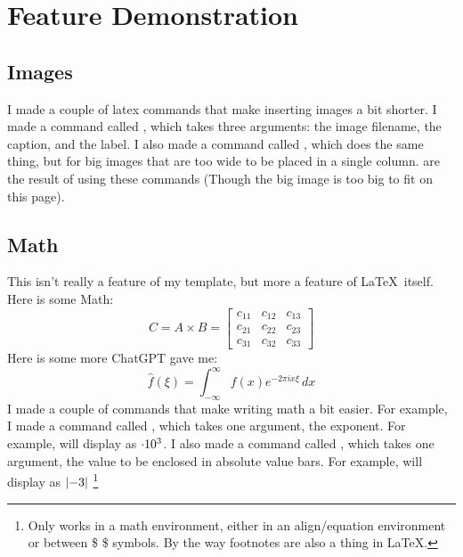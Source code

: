 \section{Feature Demonstration}

\subsection{Images}

I made a couple of latex commands that make inserting images a bit shorter. I made a command called \code{\insertimage{}{}{}}, which takes three arguments: the image filename, the caption, and the label. I also made a command called \code{\insertbigimage{}{}{}}, which does the same thing, but for big images that are too wide to be placed in a single column.  are the result of using these commands (Though the big image is too big to fit on this page).



\subsection{Math}

This isn't really a feature of my template, but more a feature of \LaTeX \ itself. 
Here is some Math:
\begin{equation}
    C = A \times B = \begin{bmatrix}
        c_{11} & c_{12} & c_{13} \\
        c_{21} & c_{22} & c_{23} \\
        c_{31} & c_{32} & c_{33}
    \end{bmatrix}
\end{equation}
Here is some more ChatGPT gave me:
\begin{equation}
    \hat{f}(\xi) = \int_{-\infty}^{\infty} f(x) e^{-2 \pi i x \xi} \, dx
\end{equation}
I made a couple of commands that make writing math a bit easier. For example, I made a command called \code{\E{}}, which takes one argument, the exponent. For example,  will display as $\cdot 10^{3}$. I also made a command called \code{\abs{}}, which takes one argument, the value to be enclosed in absolute value bars. For example,  will display as $\left\lvert -3 \right\rvert$ \footnote[1]{Only works in a math environment, either in an align/equation environment or between \$ \$ symbols. By the way footnotes are also a thing in \LaTeX.}


